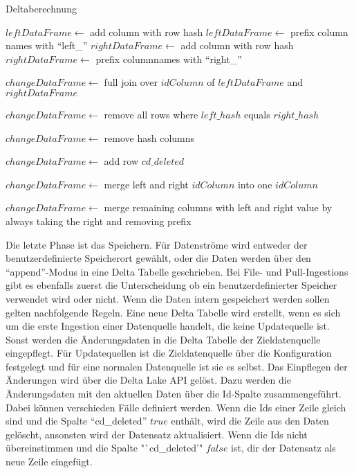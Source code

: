 \begin{algorithm}
    \caption{Deltaberechnung}
    \label{algo:delta-calc}
    $leftDataFrame \gets$ add column with row hash \;
    $leftDataFrame \gets$ prefix column names with "`left\_"' \;
    $rightDataFrame \gets$ add column with row hash \;
    $rightDataFrame \gets$ prefix columnnames with "`right\_"' \;

    $changeDataFrame \gets$ full join over $idColumn$ of $leftDataFrame$ and $rightDataFrame$ \;

    $changeDataFrame \gets$ remove all rows where $left\_hash$ equals $right\_hash$ \;

    $changeDataFrame \gets$ remove hash columns

    $changeDataFrame \gets$ add row $cd\_deleted$ \;

    $changeDataFrame \gets$ merge left and right $idColumn$ into one $idColumn$

    $changeDataFrame \gets$ merge remaining columns with left and right value by always taking the right and removing prefix

\end{algorithm}

Die letzte Phase ist das Speichern.
Für Datenströme wird entweder der benutzerdefinierte Speicherort gewählt, oder die Daten werden über den "`append"'-Modus in eine Delta Tabelle geschrieben.
Bei File- und Pull-Ingestions gibt es ebenfalls zuerst die Unterscheidung ob ein benutzerdefinierter Speicher verwendet wird oder nicht.
Wenn die Daten intern gespeichert werden sollen gelten nachfolgende Regeln.
Eine neue Delta Tabelle wird erstellt, wenn es sich um die erste Ingestion einer Datenquelle handelt, die keine Updatequelle ist.
Sonst werden die Änderungsdaten in die Delta Tabelle der Zieldatenquelle eingepflegt.
Für Updatequellen ist die Zieldatenquelle über die Konfiguration festgelegt und für eine normalen Datenquelle ist sie es selbst.
Das Einpflegen der Änderungen wird über die Delta Lake API gelöst.
Dazu werden die Änderungsdaten mit den aktuellen Daten über die Id-Spalte zusammengeführt.
Dabei können verschieden Fälle definiert werden.
Wenn die Ids einer Zeile gleich sind und die Spalte "`cd\_deleted"' $true$ enthält, wird die Zeile aus den Daten gelöscht, ansonsten wird der Datensatz aktualisiert.
Wenn die Ids nicht übereinstimmen und die Spalte "`cd\_deleted'" $false$ ist, dir der Datensatz als neue Zeile eingefügt.
